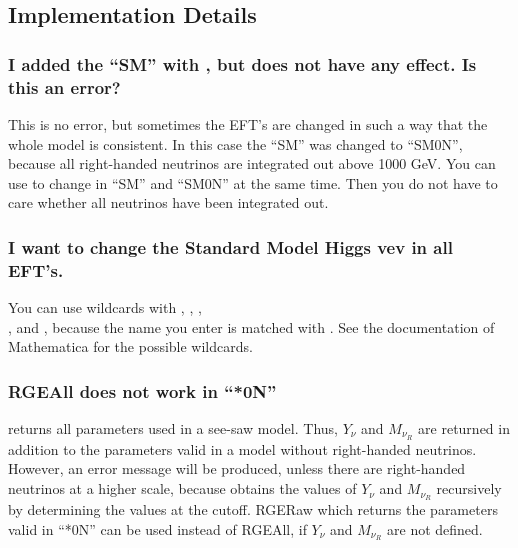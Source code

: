 \subsection{Implementation Details}

\subsubsection[``SM'' added, but \function{RGESetOptions} does not have any effect.]{I added the ``SM'' with
  , but
   does not have any
  effect. Is this an error?}

This is no error, but sometimes the EFT's are changed in such a way that the whole model is
consistent. In this case the ``SM'' was changed to ``SM0N'', because all
right-handed neutrinos are integrated out above 1000 GeV.
You can use  to change
 in ``SM'' and ``SM0N'' at the same time.
Then you do not have to care whether all neutrinos have been integrated out.

\subsubsection{I want to change the Standard Model Higgs vev in all EFT's.}
You can use wildcards with ,
, , \\
,
 and  , because the name
you enter is matched with . See the documentation of
Mathematica for the possible wildcards.

\subsubsection{RGEAll does not work in ``*0N''}
 returns all parameters used in a see-saw
model. Thus, $Y_\nu$ and $M_{\nu_R}$ are returned in addition to the parameters
valid in a model without right-handed neutrinos. However, an error message will
be produced, unless there are right-handed neutrinos at a higher scale, because
 obtains the values of $Y_\nu$ and $M_{\nu_R}$
recursively by determining the values at the cutoff. RGERaw which returns the
parameters valid in ``*0N'' can be used instead of RGEAll, if $Y_\nu$ and $M_{\nu_R}$ are not defined.


